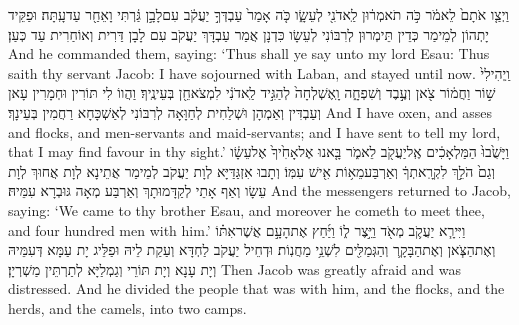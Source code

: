 {וַיְצַ֤ו אֹתָם֙ לֵאמֹ֔ר כֹּ֣ה תֹאמְר֔וּן לַֽאדֹנִ֖י לְעֵשָׂ֑ו כֹּ֤ה אָמַר֙ עַבְדְּךָ֣ יַעֲקֹ֔ב עִם\maqqaf לָבָ֣ן גַּ֔רְתִּי וָאֵחַ֖ר עַד\maqqaf עָֽתָּה׃}
{וּפַקֵּיד יָתְהוֹן לְמֵימַר כְּדֵין תֵּימְרוּן לְרִבּוֹנִי לְעֵשָׂו כִּדְנָן אֲמַר עַבְדָּךְ יַעֲקֹב עִם לָבָן דַּרִית וְאוֹחַרִית עַד כְּעַן׃}
{And he commanded them, saying: ‘Thus shall ye say unto my lord Esau: Thus saith thy servant Jacob: I have sojourned with Laban, and stayed until now.}{}
{וַֽיְהִי\maqqaf לִי֙ שׁ֣וֹר וַחֲמ֔וֹר צֹ֖אן וְעֶ֣בֶד וְשִׁפְחָ֑ה וָֽאֶשְׁלְחָה֙ לְהַגִּ֣יד לַֽאדֹנִ֔י לִמְצֹא\maqqaf חֵ֖ן בְּעֵינֶֽיךָ׃}
{וַהֲווֹ לִי תּוֹרִין וּחְמָרִין עָאן וְעַבְדִּין וְאַמְהָן וּשְׁלַחִית לְחַוָּאָה לְרִבּוֹנִי לְאַשְׁכָּחָא רַחֲמִין בְּעֵינָךְ׃}
{And I have oxen, and asses and flocks, and men-servants and maid-servants; and I have sent to tell my lord, that I may find favour in thy sight.’}{}
{וַיָּשֻׁ֙בוּ֙ הַמַּלְאָכִ֔ים אֶֽל\maqqaf יַעֲקֹ֖ב לֵאמֹ֑ר בָּ֤אנוּ אֶל\maqqaf אָחִ֙יךָ֙ אֶל\maqqaf עֵשָׂ֔ו וְגַם֙ הֹלֵ֣ךְ לִקְרָֽאתְךָ֔ וְאַרְבַּע\maqqaf מֵא֥וֹת אִ֖ישׁ עִמּֽוֹ׃}
{וְתָבוּ אִזְגַּדַּיָּא לְוָת יַעֲקֹב לְמֵימַר אֲתֵינָא לְוָת אֲחוּךְ לְוָת עֵשָׂו וְאַף אָתֵי לְקַדָּמוּתָךְ וְאַרְבַּע מְאָה גּוּבְרָא עִמֵּיהּ׃}
{And the messengers returned to Jacob, saying: ‘We came to thy brother Esau, and moreover he cometh to meet thee, and four hundred men with him.’}{}
{וַיִּירָ֧א יַעֲקֹ֛ב מְאֹ֖ד וַיֵּ֣צֶר ל֑וֹ וַיַּ֜חַץ אֶת\maqqaf הָעָ֣ם אֲשֶׁר\maqqaf אִתּ֗וֹ וְאֶת\maqqaf הַצֹּ֧אן וְאֶת\maqqaf הַבָּקָ֛ר וְהַגְּמַלִּ֖ים לִשְׁנֵ֥י מַחֲנֽוֹת׃}
{וּדְחֵיל יַעֲקֹב לַחְדָּא וְעַקַת לֵיהּ וּפַלֵּיג יָת עַמָּא דְּעִמֵּיהּ וְיָת עָנָא וְיָת תּוֹרֵי וְגַמְלַיָּא לְתַרְתֵּין מַשְׁרְיָן׃}
{Then Jacob was greatly afraid and was distressed. And he divided the people that was with him, and the flocks, and the herds, and the camels, into two camps.}{}
